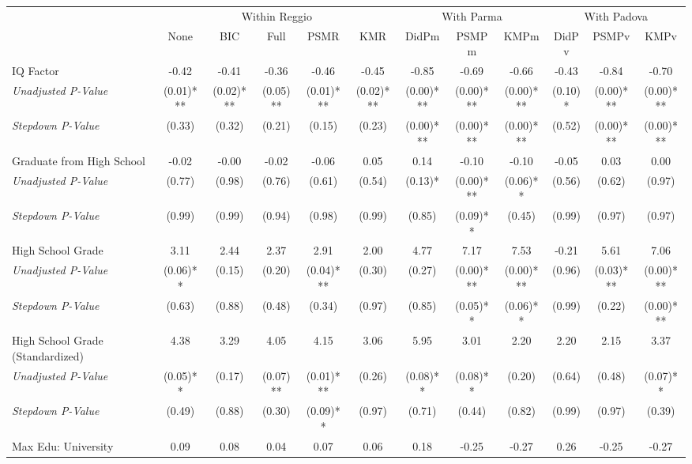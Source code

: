 \begin{tabular}{l c c c c c c c c c c c}
\toprule
& \multicolumn{5}{c}{Within Reggio} & \multicolumn{3}{c}{With Parma} & \multicolumn{3}{c}{With Padova} \\\cmidrule(lr){2-6} \cmidrule(lr){7-9} \cmidrule(lr){10-12}
 & None & BIC & Full & PSMR & KMR & DidPm & PSMPm & KMPm & DidPv & PSMPv & KMPv \\
\midrule
IQ Factor & -0.42 & -0.41 & -0.36 & -0.46 & -0.45 & -0.85 & -0.69 & -0.66 & -0.43 & -0.84 & -0.70 \\
\quad \textit{Unadjusted P-Value} & (0.01)*** & (0.02)*** & (0.05)** & (0.01)*** & (0.02)*** & (0.00)*** & (0.00)*** & (0.00)*** & (0.10)* & (0.00)*** & (0.00)*** \\
\quad \textit{Stepdown P-Value} & (0.33) & (0.32) & (0.21) & (0.15) & (0.23) & (0.00)*** & (0.00)*** & (0.00)*** & (0.52) & (0.00)*** & (0.00)*** \\
Graduate from High School & -0.02 & -0.00 & -0.02 & -0.06 & 0.05 & 0.14 & -0.10 & -0.10 & -0.05 & 0.03 & 0.00 \\
\quad \textit{Unadjusted P-Value} & (0.77) & (0.98) & (0.76) & (0.61) & (0.54) & (0.13)* & (0.00)*** & (0.06)** & (0.56) & (0.62) & (0.97) \\
\quad \textit{Stepdown P-Value} & (0.99) & (0.99) & (0.94) & (0.98) & (0.99) & (0.85) & (0.09)** & (0.45) & (0.99) & (0.97) & (0.97) \\
High School Grade & 3.11 & 2.44 & 2.37 & 2.91 & 2.00 & 4.77 & 7.17 & 7.53 & -0.21 & 5.61 & 7.06 \\
\quad \textit{Unadjusted P-Value} & (0.06)** & (0.15) & (0.20) & (0.04)*** & (0.30) & (0.27) & (0.00)*** & (0.00)*** & (0.96) & (0.03)*** & (0.00)*** \\
\quad \textit{Stepdown P-Value} & (0.63) & (0.88) & (0.48) & (0.34) & (0.97) & (0.85) & (0.05)** & (0.06)** & (0.99) & (0.22) & (0.00)*** \\
High School Grade (Standardized) & 4.38 & 3.29 & 4.05 & 4.15 & 3.06 & 5.95 & 3.01 & 2.20 & 2.20 & 2.15 & 3.37 \\
\quad \textit{Unadjusted P-Value} & (0.05)** & (0.17) & (0.07)** & (0.01)*** & (0.26) & (0.08)** & (0.08)** & (0.20) & (0.64) & (0.48) & (0.07)** \\
\quad \textit{Stepdown P-Value} & (0.49) & (0.88) & (0.30) & (0.09)** & (0.97) & (0.71) & (0.44) & (0.82) & (0.99) & (0.97) & (0.39) \\
Max Edu: University & 0.09 & 0.08 & 0.04 & 0.07 & 0.06 & 0.18 & -0.25 & -0.27 & 0.26 & -0.25 & -0.27 \\

\end{tabular}
